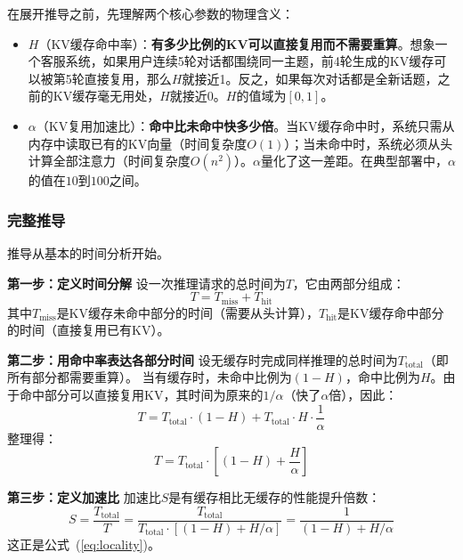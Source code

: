 在展开推导之前，先理解两个核心参数的物理含义：

\begin{itemize}[nosep]
\item $H$（KV缓存命中率）：\textbf{有多少比例的KV可以直接复用而不需要重算}。想象一个客服系统，如果用户连续5轮对话都围绕同一主题，前4轮生成的KV缓存可以被第5轮直接复用，那么$H$就接近1。反之，如果每次对话都是全新话题，之前的KV缓存毫无用处，$H$就接近0。$H$的值域为$[0, 1]$。
\item $\alpha$（KV复用加速比）：\textbf{命中比未命中快多少倍}。当KV缓存命中时，系统只需从内存中读取已有的KV向量（时间复杂度$O(1)$）；当未命中时，系统必须从头计算全部注意力（时间复杂度$O(n^2)$）。$\alpha$量化了这一差距。在典型部署中，$\alpha$的值在$10$到$100$之间。
\end{itemize}

\subsubsection{完整推导}

推导从基本的时间分析开始。

\textbf{第一步：定义时间分解}
设一次推理请求的总时间为$T$，它由两部分组成：
\begin{equation}
T = T_{\mathrm{miss}} + T_{\mathrm{hit}}
\end{equation}
其中$T_{\mathrm{miss}}$是KV缓存未命中部分的时间（需要从头计算），$T_{\mathrm{hit}}$是KV缓存命中部分的时间（直接复用已有KV）。

\textbf{第二步：用命中率表达各部分时间}
设无缓存时完成同样推理的总时间为$T_{\mathrm{total}}$（即所有部分都需要重算）。
当有缓存时，未命中比例为$(1-H)$，命中比例为$H$。由于命中部分可以直接复用KV，其时间为原来的$1/\alpha$（快了$\alpha$倍），因此：
\begin{equation}
T = T_{\mathrm{total}} \cdot (1-H) + T_{\mathrm{total}} \cdot H \cdot \frac{1}{\alpha}
\end{equation}
整理得：
\begin{equation}
T = T_{\mathrm{total}} \cdot \left[(1-H) + \frac{H}{\alpha}\right]
\end{equation}

\textbf{第三步：定义加速比}
加速比$S$是有缓存相比无缓存的性能提升倍数：
\begin{equation}
S = \frac{T_{\mathrm{total}}}{T} = \frac{T_{\mathrm{total}}}{T_{\mathrm{total}} \cdot \left[(1-H) + H/\alpha\right]} = \frac{1}{(1-H) + H/\alpha}
\end{equation}
这正是公式~(\ref{eq:locality})。

